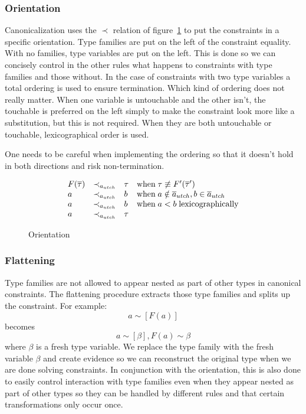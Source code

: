 \subsubsection{Orientation}
Canonicalization uses the $\prec$ relation of figure~\ref{fig:orientation} to
put the constraints in a specific orientation. Type families are put on the left
of the constraint equality. With no families, type variables are put on the
left. This is done so we can concisely control in the other rules what happens
to constraints with type families and those without. In the case of constraints
with two type variables a total ordering is used to ensure termination. Which
kind of ordering does not really matter. When one variable is untouchable and
the other isn't, the touchable is preferred on the left simply to make the
constraint look more like a substitution, but this is not required. When they
are both untouchable or touchable, lexicographical order is used.

One needs to be careful when implementing the ordering so that it doesn't hold
in both directions and risk non-termination.

\begin{figure}
\[
\begin{array}{l c l l}
F(\overline{\tau}) &\prec_{a_{utch}}& \tau &\text{when} \; \tau \not\equiv
F'(\overline{\tau}')
\\
a &\prec_{a_{utch}}& b &\text{when} \; a \notin \overline{a}_{utch}, b \in
\overline{a}_{utch}
\\
a &\prec_{a_{utch}}& b &\text{when} \; a < b \; \text{lexicographically}
\\
a &\prec_{a_{utch}}& \tau
\end{array}
\]
\caption{Orientation}
\label{fig:orientation}
\end{figure}

\subsubsection{Flattening}
Type families are not allowed to appear nested as part of other types in
canonical constraints. The flattening procedure extracts those type families and
splits up the constraint. For example: %
$$
a \sim [F(a)]
$$
becomes
$$
a \sim [\beta], F(a) \sim \beta
$$
where $\beta$ is a fresh type variable. We replace the type family with the
fresh variable $\beta$ and create evidence so we can reconstruct the original
type when we are done solving constraints. In conjunction with the orientation,
this is also done to easily control interaction with type families even when
they appear nested as part of other types so they can be handled by different
rules and that certain transformations only occur once.

